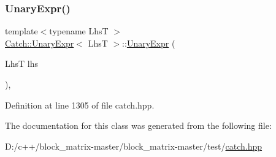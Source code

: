 \subsubsection{\texorpdfstring{Unary\+Expr()}{UnaryExpr()}}
{\footnotesize\ttfamily template$<$typename LhsT $>$ \\
\mbox{\hyperlink{class_catch_1_1_unary_expr}{Catch\+::\+Unary\+Expr}}$<$ LhsT $>$\+::\mbox{\hyperlink{class_catch_1_1_unary_expr}{Unary\+Expr}} (\begin{DoxyParamCaption}\item[{LhsT}]{lhs }\end{DoxyParamCaption})\hspace{0.3cm}{\ttfamily [inline]}, {\ttfamily [explicit]}}



Definition at line 1305 of file catch.\+hpp.



The documentation for this class was generated from the following file\+:\begin{DoxyCompactItemize}
\item 
D\+:/c++/block\+\_\+matrix-\/master/block\+\_\+matrix-\/master/test/\mbox{\hyperlink{catch_8hpp}{catch.\+hpp}}\end{DoxyCompactItemize}
